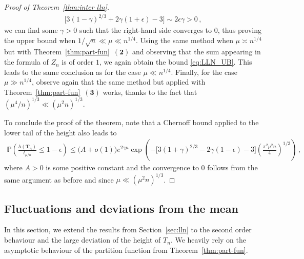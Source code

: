 \documentclass{article}
\newcommand{\pr}{\mathbb{P}}								%
\newcommand{\Prob}[1]{\pr\left(#1\right)}					%
\newcommand{\1}{\mathbbm{1}}								%
\theoremstyle{definition}
\numberwithin{equation}{section}
\newcommand{\bT}{\mathbf T}
\newcommand{\numitem}[1]{$\mathbf{(#1)}$}
\begin{document}
\begin{proof}[Proof of Theorem~\ref{thm:inter lln}]
    \begin{align*}
        \Big[3(1-\gamma)^{2/3}+2\gamma(1+\epsilon)-3\Big]\sim2\epsilon\gamma>0\,,
    \end{align*}
    we can find some $\gamma>0$ such that the right-hand side converges to $0$, thus proving the upper bound when $1/\sqrt{n}\ll\mu\ll n^{1/4}$.
    Using the same method when $\mu\asymp  n^{1/4}$ but with Theorem~\ref{thm:part-fun}~\numitem{2} and observing that the sum appearing in the formula of $Z_n$ is of order $1$, we again obtain the bound \eqref{eq:LLN_UB}.
    This leads to the same conclusion as for the case $\mu\ll n^{1/4}$.
    Finally, for the case $\mu\gg n^{1/4}$, observe again that the same method but applied with Theorem~\ref{thm:part-fun}~\numitem{3} works, thanks to the fact that $(\mu^4/n)^{1/3}\ll(\mu^2n)^{1/3}$.

    To conclude the proof of the theorem, note that a Chernoff bound applied to the lower tail of the height also leads to
    \begin{align*}
        \Prob{\frac{h(\bT_n)}{t_{\mu/n}}\leq1-\epsilon}\leq\big(A+o(1)\big)e^{2\gamma\mu}\exp\left(-\Big[3(1+\gamma)^{2/3}-2\gamma(1-\epsilon)-3\big]\left(\frac{\pi^2\mu^2n}{4}\right)^{1/3}\right)\,,
    \end{align*}
    where $A>0$ is some positive constant and the convergence to $0$ follows from the same argument as before and since $\mu\ll(\mu^2n)^{1/3}$.
\end{proof}


\subsection{Fluctuations and deviations from the mean}\label{sec:clt}

In this section, we extend the results from Section~\ref{sec:lln} to the second order behaviour and the large deviation of the height of $T_n$.
We heavily rely on the asymptotic behaviour of the partition function from Theorem~\ref{thm:part-fun}.
\end{document}
